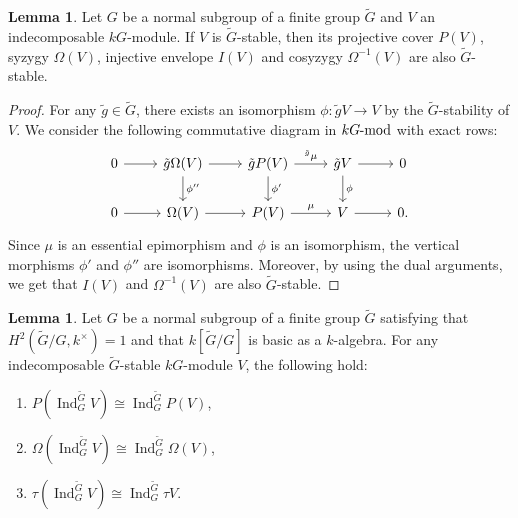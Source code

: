 \documentclass[pdftex,a4paper]{article}
\numberwithin{equation}{subsection}
\theoremstyle{definition}
\newtheorem{lemma}[theorem]{Lemma}
\newcommand{\lmod}{\operatorname{\mathrm{\hspace{-2pt}-mod}}}
\newcommand{\induc}{{\operatorname{Ind}\nolimits}}
\begin{document}
\begin{lemma}\label{2021-09-09 18:06:40}
	Let \(G\) be a normal subgroup of a finite group \(\tilde{G}\) and \(V\) an indecomposable \(kG\)-module.
	If \(V\) is \(\tilde{G}\)-stable, then its projective cover \(P(V)\), syzygy \(\Omega(V)\), injective envelope \(I(V)\) and cosyzygy \(\Omega^{-1}(V)\) are also \(\tilde{G}\)-stable.
\end{lemma}
\begin{proof}
	For any \(\tilde{g}\in \tilde{G}\), there exists an isomorphism \(\phi\colon \tilde{g}V\rightarrow V\) by the \(\tilde{G}\)-stability of \(V\).
	We consider the following commutative diagram in \(kG\lmod\) with exact rows:
	\begin{equation}
		\begin{tikzcd}
			0\ar[r]&\tilde{g}\Omega (V) \ar[r] \ar[d,"\phi''"]& \tilde{g}P (V) \ar[r,"{}^{\tilde{g}}\mu"]\ar[d,"\phi'"]& \tilde{g}V\ar[r] \ar[d,"\phi"] & 0\\
			0\ar[r]&\Omega(V) \ar[r] & P(V) \ar[r,"\mu"] &  V\ar[r] &0.
		\end{tikzcd}
	\end{equation}
	Since \(\mu\) is an essential epimorphism and \(\phi\) is an isomorphism, the vertical morphisms \(\phi'\) and \(\phi''\) are  isomorphisms.
	Moreover, by using the dual arguments, we get that \(I(V)\) and \(\Omega^{-1}(V)\) are also \(\tilde{G}\)-stable.
\end{proof}
\begin{lemma}\label{induction functor projective cover 2021-09-07 12:06:47}
	Let \(G\) be a normal subgroup of a finite group \(\tilde{G}\) satisfying that \(H^2(\tilde{G}/G,k^\times)=1\) and that \(k[\tilde{G}/G]\) is basic as a \(k\)-algebra.
	For any indecomposable \(\tilde{G}\)-stable \(kG\)-module \(V\), the following hold:
	\begin{enumerate}
		\item \(P(\induc_G^{\tilde{G}} V)\cong \induc_G^{\tilde{G}} P(V)\),\label{2020-03-25 01:17:41}
		\item \(\Omega (\induc_G^{\tilde{G}} V)\cong \induc_G^{\tilde{G}} \Omega(V)\),\label{2020-03-25 01:17:47}
		\item \(\tau(\induc_G^{\tilde{G}} V)\cong \induc_G^{\tilde{G}} \tau V\).\label{2020-03-25 01:17:54}
	\end{enumerate}
\end{lemma}
\end{document}
